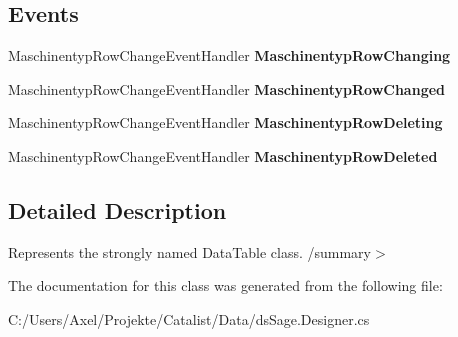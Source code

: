 \subsection*{Events}
\begin{DoxyCompactItemize}
\item 
Maschinentyp\+Row\+Change\+Event\+Handler {\bfseries Maschinentyp\+Row\+Changing}\hypertarget{class_products_1_1_data_1_1ds_sage_1_1_maschinentyp_data_table_ae2d9903e1ca39def22fd1f312f76280a}{}\label{class_products_1_1_data_1_1ds_sage_1_1_maschinentyp_data_table_ae2d9903e1ca39def22fd1f312f76280a}

\item 
Maschinentyp\+Row\+Change\+Event\+Handler {\bfseries Maschinentyp\+Row\+Changed}\hypertarget{class_products_1_1_data_1_1ds_sage_1_1_maschinentyp_data_table_a3cf6f22962d201512f5fe970265a429f}{}\label{class_products_1_1_data_1_1ds_sage_1_1_maschinentyp_data_table_a3cf6f22962d201512f5fe970265a429f}

\item 
Maschinentyp\+Row\+Change\+Event\+Handler {\bfseries Maschinentyp\+Row\+Deleting}\hypertarget{class_products_1_1_data_1_1ds_sage_1_1_maschinentyp_data_table_ae11fa426ea423cea954b9ce93407baf9}{}\label{class_products_1_1_data_1_1ds_sage_1_1_maschinentyp_data_table_ae11fa426ea423cea954b9ce93407baf9}

\item 
Maschinentyp\+Row\+Change\+Event\+Handler {\bfseries Maschinentyp\+Row\+Deleted}\hypertarget{class_products_1_1_data_1_1ds_sage_1_1_maschinentyp_data_table_ae929215586270d09e4cc88b7523c7542}{}\label{class_products_1_1_data_1_1ds_sage_1_1_maschinentyp_data_table_ae929215586270d09e4cc88b7523c7542}

\end{DoxyCompactItemize}


\subsection{Detailed Description}
Represents the strongly named Data\+Table class. /summary$>$ 

The documentation for this class was generated from the following file\+:\begin{DoxyCompactItemize}
\item 
C\+:/\+Users/\+Axel/\+Projekte/\+Catalist/\+Data/ds\+Sage.\+Designer.\+cs\end{DoxyCompactItemize}
